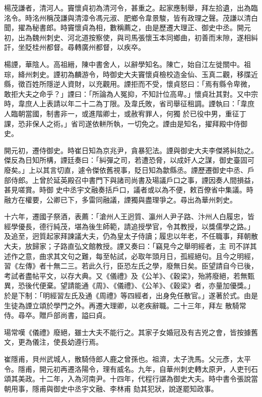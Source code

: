 \begin{pinyinscope}
 楊茂謙者，清河人。竇懷貞初為清河令，甚重之。起家應制舉，拜左拾遺，出為臨洺令。時洺州稱茂謙與清漳令馮元淑、肥鄉令韋景駿，皆有政理之聲。茂謙以清白聞，擢為秘書郎。時竇懷貞為相，數稱薦之，由是歷遷大理正、御史中丞。開元初，出為魏州刺史、河北道按察使，與司馬張懷玉本同鄉曲，初善而末隙，遂相糾訐，坐貶桂州都督。尋轉廣州都督，以疾卒。



 楊諲，華陰人。高祖縉，陳中書舍人，以辭學知名。陳亡，始自江左徙關中。祖琮，絳州刺史。諲初為麟游令，時御史大夫竇懷貞檢校造金仙、玉真二觀，移牒近縣，徵百姓所隱逆人資財，以充觀用。諲拒而不受，懷貞怒曰：「焉有縣令卑微，敢拒大夫之命乎？」諲曰：「所論為人冤抑，不知計位高卑。」懷貞壯其對。又中宗時，韋庶人上表請以年二十二為丁限。及韋氏敗，省司舉征租調。諲執曰：「韋庶人臨朝當國，制書非一，或進階卿士，或赦宥罪人，何獨
 於已役中男，重征丁課，恐非保人之術。」省司遂依軿所執，一切免之。諲由是知名，擢拜殿中侍御史。



 開元初，遷侍御史。時崔日知為京兆尹，貪暴犯法。諲與御史大夫李傑將糾劾之。傑反為日知所構，諲廷奏曰：「糾彈之司，若遭恐脅，以成奸人之謀，御史臺固可廢矣。」上以其言切直，遽令傑依舊視事，貶日知為歙縣丞。諲歷遷御史中丞、戶部侍郎。上曾於延英殿召中書門下與諸司尚書及瑒議戶口之事，諲因奏人間損益，甚見嗟賞。時御
 史中丞宇文融奏括戶口，議者或以為不便，敕百僚省中集議。時融方在權要，公卿已下，多雷同融議，諲獨與盡理爭之。尋出為華州刺史。



 十六年，遷國子祭酒，表薦：「滄州人王迥質、瀛州人尹子路、汴州人白履忠，皆經學優長，德行純茂，堪為後生師範，請追授學官，令其教授，以獎儒學之路。」及追至，迥質起家拜諫議大夫，仍為皇太子侍讀；履忠以年老，不任職事，拜朝散大夫，放歸家；子路直弘文館教授。諲又奏曰：「竊見今之舉明經者，主
 司不詳其述作之意，曲求其文句之難，每至帖試，必取年頭月日，孤經絕句。且今之明經，習《左傳》者十無二三。若此久行，臣恐左氏之學，廢無日矣。臣望請自今已後，考試者盡帖平文，以存大典。又《儀禮》及《公羊》、《穀梁》，殆將廢絕，若無甄異，恐後代便棄。望請能通《周》、《儀禮》、《公羊》、《穀梁》者，亦量加優獎。」於是下制：「明經習左氏及通《周禮》等四經者，出身免任散官。」遂著於式。由是生徒為諲立頌於學門之外。再遷大理卿，以老疾辭職。二十三年，拜左
 散騎常侍。尋卒。贈戶部尚書，謚曰貞。



 瑒常嘆《儀禮》廢絕，雖士大夫不能行之。其家子女婚冠及有吉兇之會，皆按據舊文，更為儀注，使長幼遵行焉。



 崔隱甫，貝州武城人，散騎侍郎人鹿之曾孫也。祖濟，太子洗馬。父元彥，太平令。隱甫，開元初再遷洛陽令，理有威名。九年，自華州刺史轉太原尹，人吏刊石頌其美政。十二年，入為河南尹。十四年，代程行諶為御史大夫。時中書令張說當朝用事，隱甫與御史中丞宇文融、李林甫
 劾其犯狀，說遂罷知政事。




\end{pinyinscope}
